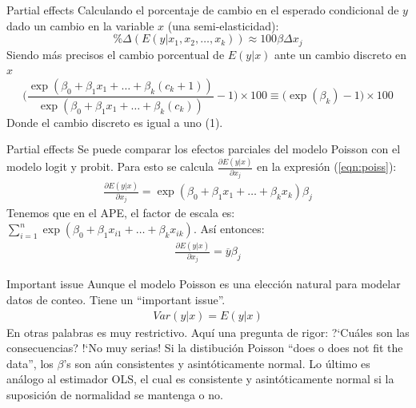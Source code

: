 \begin{frame}{Partial effects}
	Calculando el porcentaje de cambio en el esperado condicional de $y$ dado un cambio en la variable $x$ (una semi-elasticidad):
		\begin{equation}
			\%\Delta (E(y|x_1,x_2, \dots, x_k))\approx100\beta \Delta x_j
		\end{equation}
	Siendo más precisos el cambio porcentual de $E(y|x)$ ante un cambio discreto en $x$
		\begin{equation}
			\Big(\frac{\exp(\beta_0+\beta_1x_1+\dots+\beta_k(c_k+1))}{\exp(\beta_0+\beta_1x_1+\dots+\beta_k(c_k))}-1\Big)\times 100 \equiv \Big(\exp(\beta_k)-1\Big) \times 100
		\end{equation}
	Donde el cambio discreto es igual a uno (1).
\end{frame}
\begin{frame}{Partial effects}
	Se puede comparar los efectos parciales del modelo Poisson con el modelo logit y probit. Para esto se calcula $\frac{\partial E(y|x)}{\partial x_j} $ en la expresión (\ref{eqn:poiss}):
		\begin{align}
			\frac{\partial E(y|x)}{\partial x_j} =\exp(\beta_0+\beta_1x_1+\dots+\beta_kx_k) \beta_j
		\end{align}
	Tenemos que en el APE, el factor de escala es: $\sum_{i=1}^n \exp(\beta_0+\beta_1x_{i1}+\dots+\beta_kx_{ik}) $. Así entonces:
		\begin{align}
			\frac{\partial E(y|x)}{\partial x_j} =\overline{y}  \beta_j
		\end{align}
\end{frame}
\begin{frame}{Important issue}
	Aunque el modelo Poisson es una elección natural para modelar datos de conteo. Tiene un ``important issue''.
		\begin{align}
			Var(y|x)=E(y|x)
		\end{align}
	En otras palabras es muy restrictivo. Aquí una pregunta de rigor: ?`Cuáles son las consecuencias? !`No muy serias! Si la distibución Poisson ``does o does not fit the data'', los $\beta$'s son aún consistentes y asintóticamente normal. Lo último es análogo al estimador OLS, el cual es consistente y asintóticamente normal si la suposición de normalidad se mantenga o no.
\end{frame}
